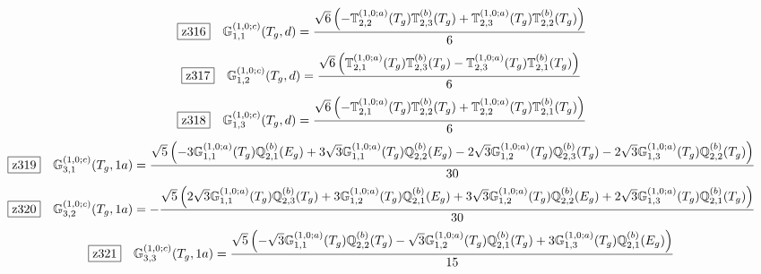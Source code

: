 \documentclass[fleqn,10pt,landscape]{jsarticle}
\begin{document}
\begin{dmath*}
\hspace*{3mm}\fbox{z316}\quad \mathbb{G}_{1,1}^{(1,0;c)}(T_{g},d)=\frac{\sqrt{6} \left(- \mathbb{T}_{2,2}^{(1,0;a)}(T_{g}) \mathbb{T}_{2,3}^{(b)}(T_{g}) + \mathbb{T}_{2,3}^{(1,0;a)}(T_{g}) \mathbb{T}_{2,2}^{(b)}(T_{g})\right)}{6}
\end{dmath*}
\begin{dmath*}
\hspace*{3mm}\fbox{z317}\quad \mathbb{G}_{1,2}^{(1,0;c)}(T_{g},d)=\frac{\sqrt{6} \left(\mathbb{T}_{2,1}^{(1,0;a)}(T_{g}) \mathbb{T}_{2,3}^{(b)}(T_{g}) - \mathbb{T}_{2,3}^{(1,0;a)}(T_{g}) \mathbb{T}_{2,1}^{(b)}(T_{g})\right)}{6}
\end{dmath*}
\begin{dmath*}
\hspace*{3mm}\fbox{z318}\quad \mathbb{G}_{1,3}^{(1,0;c)}(T_{g},d)=\frac{\sqrt{6} \left(- \mathbb{T}_{2,1}^{(1,0;a)}(T_{g}) \mathbb{T}_{2,2}^{(b)}(T_{g}) + \mathbb{T}_{2,2}^{(1,0;a)}(T_{g}) \mathbb{T}_{2,1}^{(b)}(T_{g})\right)}{6}
\end{dmath*}
\begin{dmath*}
\hspace*{3mm}\fbox{z319}\quad \mathbb{G}_{3,1}^{(1,0;c)}(T_{g},1a)=\frac{\sqrt{5} \left(- 3 \mathbb{G}_{1,1}^{(1,0;a)}(T_{g}) \mathbb{Q}_{2,1}^{(b)}(E_{g}) + 3 \sqrt{3} \mathbb{G}_{1,1}^{(1,0;a)}(T_{g}) \mathbb{Q}_{2,2}^{(b)}(E_{g}) - 2 \sqrt{3} \mathbb{G}_{1,2}^{(1,0;a)}(T_{g}) \mathbb{Q}_{2,3}^{(b)}(T_{g}) - 2 \sqrt{3} \mathbb{G}_{1,3}^{(1,0;a)}(T_{g}) \mathbb{Q}_{2,2}^{(b)}(T_{g})\right)}{30}
\end{dmath*}
\begin{dmath*}
\hspace*{3mm}\fbox{z320}\quad \mathbb{G}_{3,2}^{(1,0;c)}(T_{g},1a)=- \frac{\sqrt{5} \left(2 \sqrt{3} \mathbb{G}_{1,1}^{(1,0;a)}(T_{g}) \mathbb{Q}_{2,3}^{(b)}(T_{g}) + 3 \mathbb{G}_{1,2}^{(1,0;a)}(T_{g}) \mathbb{Q}_{2,1}^{(b)}(E_{g}) + 3 \sqrt{3} \mathbb{G}_{1,2}^{(1,0;a)}(T_{g}) \mathbb{Q}_{2,2}^{(b)}(E_{g}) + 2 \sqrt{3} \mathbb{G}_{1,3}^{(1,0;a)}(T_{g}) \mathbb{Q}_{2,1}^{(b)}(T_{g})\right)}{30}
\end{dmath*}
\begin{dmath*}
\hspace*{3mm}\fbox{z321}\quad \mathbb{G}_{3,3}^{(1,0;c)}(T_{g},1a)=\frac{\sqrt{5} \left(- \sqrt{3} \mathbb{G}_{1,1}^{(1,0;a)}(T_{g}) \mathbb{Q}_{2,2}^{(b)}(T_{g}) - \sqrt{3} \mathbb{G}_{1,2}^{(1,0;a)}(T_{g}) \mathbb{Q}_{2,1}^{(b)}(T_{g}) + 3 \mathbb{G}_{1,3}^{(1,0;a)}(T_{g}) \mathbb{Q}_{2,1}^{(b)}(E_{g})\right)}{15}
\end{dmath*}
\end{document}
